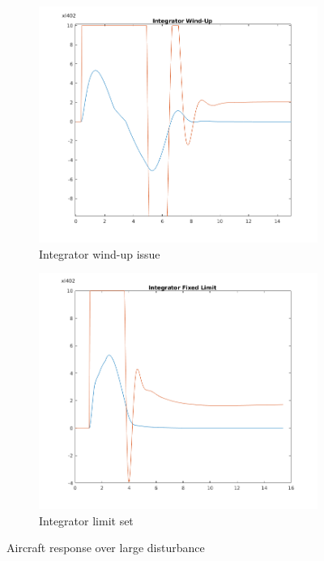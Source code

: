 \documentclass{article}
\begin{document}
\begin{figure}[htp]
\centering
\begin{subfigure}{.5\textwidth}
  \centering
  \includegraphics[width=0.9\linewidth]{wind_up.png}
	\caption{Integrator wind-up issue}
	\label{fig:wind}
\end{subfigure}%
\begin{subfigure}{.5\textwidth}
  \centering
  \includegraphics[width=0.9\linewidth]{wind_up_fixed.png}
  \caption{Integrator limit set}
  \label{fig:wind_fixed}
\end{subfigure}
\caption{Aircraft response over large disturbance}
\end{figure}
\end{document}
